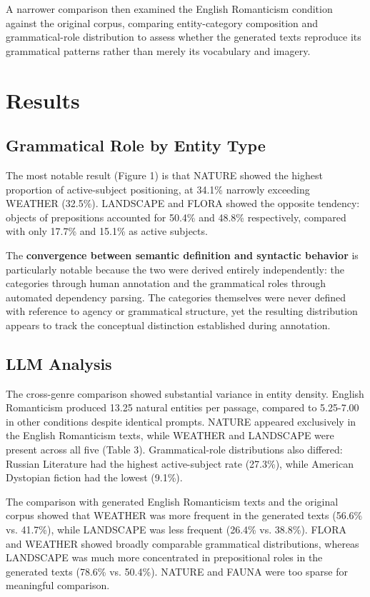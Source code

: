 \documentclass[11pt]{article}
\begin{document}
A narrower comparison then examined the English Romanticism condition against the original corpus, comparing entity-category composition and grammatical-role distribution to assess whether the generated texts reproduce its grammatical patterns rather than merely its vocabulary and imagery.

\section{Results}

\subsection{Grammatical Role by Entity Type}
The most notable result (Figure 1) is that NATURE showed the highest proportion of active-subject positioning, at 34.1\% narrowly exceeding WEATHER (32.5\%). LANDSCAPE and FLORA showed the opposite tendency: objects of prepositions accounted for 50.4\% and 48.8\% respectively, compared with only 17.7\% and 15.1\% as active subjects.

The \textbf{convergence between semantic definition and syntactic behavior} is particularly notable because the two were derived entirely independently: the categories through human annotation and the grammatical roles through automated dependency parsing. The categories themselves were never defined with reference to agency or grammatical structure, yet the resulting distribution appears to track the conceptual distinction established during annotation.

\subsection{LLM Analysis}
The cross-genre comparison showed substantial variance in entity density. English Romanticism produced 13.25 natural entities per passage, compared to 5.25-7.00 in other conditions despite identical prompts. NATURE appeared exclusively in the English Romanticism texts, while WEATHER and LANDSCAPE were present across all five (Table 3). Grammatical-role distributions also differed: Russian Literature had the highest active-subject rate (27.3\%), while American Dystopian fiction had the lowest (9.1\%).

The comparison with generated English Romanticism texts and the original corpus showed that WEATHER was more frequent in the generated texts (56.6\% vs. 41.7\%), while LANDSCAPE was less frequent (26.4\% vs. 38.8\%). FLORA and WEATHER showed broadly comparable grammatical distributions, whereas LANDSCAPE was much more concentrated in prepositional roles in the generated texts (78.6\% vs. 50.4\%). NATURE and FAUNA were too sparse for meaningful comparison.
\end{document}
